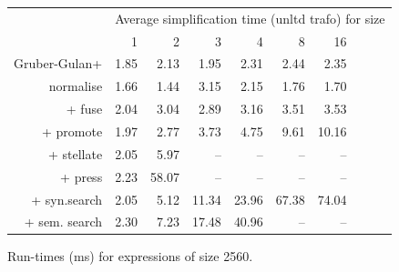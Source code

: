 \begin{figure}\begin{tabular}{rrrrrrrrrr}
 & \multicolumn{9}{c}{Average simplification time (unltd trafo) for size} \\
 & 1 & 2 & 3 & 4 & 8 & 16 \\
Gruber-Gulan+ & 1.85 & 2.13 & 1.95 & 2.31 & 2.44 & 2.35 \\
normalise & 1.66 & 1.44 & 3.15 & 2.15 & 1.76 & 1.70 \\
+ fuse & 2.04 & 3.04 & 2.89 & 3.16 & 3.51 & 3.53 \\
+ promote & 1.97 & 2.77 & 3.73 & 4.75 & 9.61 & 10.16 \\
+ stellate & 2.05 & 5.97 & -- & -- & -- & -- \\
+ press & 2.23 & 58.07 & -- & -- & -- & -- \\
+ syn.search & 2.05 & 5.12 & 11.34 & 23.96 & 67.38 & 74.04 \\
+ sem. search & 2.30 & 7.23 & 17.48 & 40.96 & -- & -- \\
\end{tabular}\caption{Run-times (ms) for expressions of size 2560.}\end{figure}
